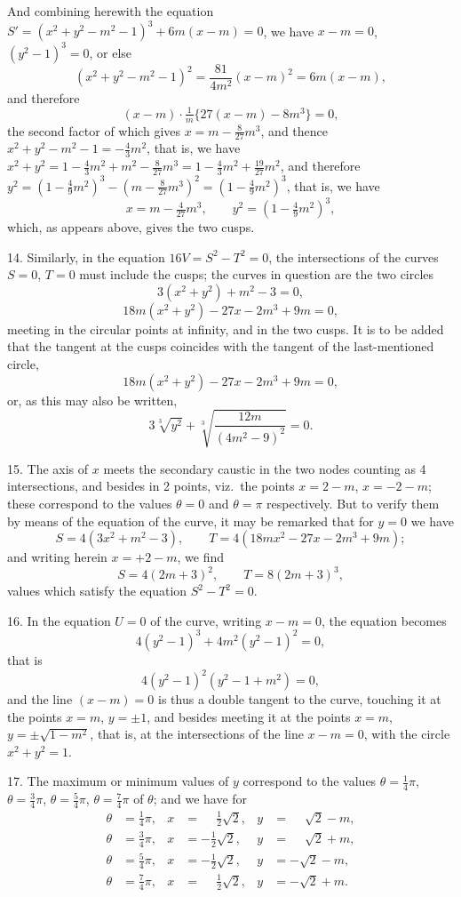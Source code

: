 \documentclass[11pt,a4paper]{article}
\theoremstyle{plain}
\begin{document}
And combining herewith the equation $S' = (x^2 + y^2 - m^2 - 1)^3 + 6m(x-m) = 0$, we have $x - m = 0$, $(y^2 - 1)^3 = 0$, or else
\[
(x^2 + y^2 - m^2 - 1)^2 = \frac{81}{4m^2}(x-m)^2 = 6m(x-m),
\]
and therefore
\[
(x-m)\cdot\tfrac{1}{m}\{27(x-m) - 8m^3\} = 0,
\]
the second factor of which gives $x = m - \frac{8}{27}m^3$, and thence $x^2 + y^2 - m^2 - 1 = -\frac{4}{3}m^2$, that is, we have $x^2 + y^2 = 1 - \frac{4}{3}m^2 + m^2 - \frac{8}{27}m^3 = 1 - \frac{4}{3}m^2 + \frac{19}{27}m^2$, and therefore $y^2 = (1 - \frac49m^2)^3 - (m - \frac{8}{27}m^3)^2 = (1 - \frac49m^2)^3$, that is, we have
\[
x = m - \tfrac{4}{27}m^3, \qquad y^2 = (1 - \tfrac49m^2)^3,
\]
which, as appears above, gives the two cusps.

14. Similarly, in the equation $16V = S^2 - T^2 = 0$, the intersections of the curves $S = 0$, $T = 0$ must include the cusps; the curves in question are the two circles
\[
3(x^2 + y^2) + m^2 - 3 = 0,
\]
\[
18m(x^2 + y^2) - 27x - 2m^3 + 9m = 0,
\]
meeting in the circular points at infinity, and in the two cusps. It is to be added that the tangent at the cusps coincides with the tangent of the last-mentioned circle,
\[
18m(x^2 + y^2) - 27x - 2m^3 + 9m = 0,
\]
or, as this may also be written,
\[
3\sqrt[3]{y^2} + \sqrt[3]{\frac{12m}{(4m^2 - 9)^2}} = 0.
\]

15. The axis of $x$ meets the secondary caustic in the two nodes counting as 4 intersections, and besides in 2 points, viz.\ the points $x = 2 - m$, $x = -2 - m$; these correspond to the values $\theta = 0$ and $\theta = \pi$ respectively. But to verify them by means of the equation of the curve, it may be remarked that for $y = 0$ we have
\[
S = 4(3x^2 + m^2 - 3), \qquad T = 4(18mx^2 - 27x - 2m^3 + 9m);
\]
and writing herein $x = +2 - m$, we find
\[
S = 4(2m + 3)^2, \qquad T = 8(2m + 3)^3,
\]
values which satisfy the equation $S^2 - T^2 = 0$.

16. In the equation $U = 0$ of the curve, writing $x - m = 0$, the equation becomes
\[
4(y^2 - 1)^3 + 4m^2(y^2 - 1)^2 = 0,
\]
that is
\[
4(y^2 - 1)^2(y^2 - 1 + m^2) = 0,
\]
and the line $(x - m) = 0$ is thus a double tangent to the curve, touching it at the points $x = m$, $y = \pm 1$, and besides meeting it at the points $x = m$, $y = \pm\sqrt{1 - m^2}$, that is, at the intersections of the line $x - m = 0$, with the circle $x^2 + y^2 = 1$.

17. The maximum or minimum values of $y$ correspond to the values
$\theta = \tfrac14\pi$, $\theta = \tfrac34\pi$,
$\theta = \tfrac54\pi$, $\theta = \tfrac74\pi$ of $\theta$; and we have for
\begin{align*}
\theta &= \tfrac14\pi, & x &= \phantom{-}\tfrac12\sqrt{2}, & y &= \phantom{-}\sqrt{2} - m, \\
\theta &= \tfrac34\pi, & x &= -\tfrac12\sqrt{2}, & y &= \phantom{-}\sqrt{2} + m, \\
\theta &= \tfrac54\pi, & x &= -\tfrac12\sqrt{2}, & y &= -\sqrt{2} - m, \\
\theta &= \tfrac74\pi, & x &= \phantom{-}\tfrac12\sqrt{2}, & y &= -\sqrt{2} + m.
\end{align*}
\end{document}
